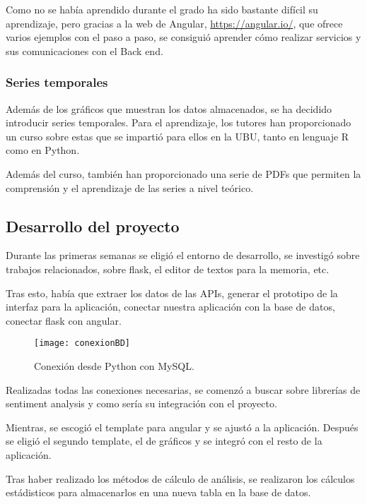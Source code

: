 Como no se había aprendido durante el grado ha sido bastante difícil su aprendizaje, pero gracias a la web de Angular, \url{https://angular.io/}, que ofrece varios ejemplos con el paso a paso, se consiguió aprender cómo realizar servicios y sus comunicaciones con el Back end.

\subsubsection{Series temporales} \cite{time_series_book}
Además de los gráficos que muestran los datos almacenados, se ha decidido introducir series temporales.
Para el aprendizaje, los tutores han proporcionado un curso sobre estas que se impartió para ellos en la UBU, tanto en lenguaje R como en Python.

Además del curso, también han proporcionado una serie de PDFs que permiten la comprensión y el aprendizaje de las series a nivel teórico.

\subsection{Desarrollo del proyecto}
Durante las primeras semanas se eligió el entorno de desarrollo, se investigó sobre trabajos relacionados, sobre flask, el editor de textos para la memoria, etc. 

Tras esto, había que extraer los datos de las APIs, generar el prototipo de la interfaz para la aplicación, conectar nuestra aplicación con la base de datos, conectar flask con angular.
\begin{figure}[h]
    \centering
    \texttt{[image: conexionBD]}
    \caption{Conexión desde Python con MySQL.}
    \label{fig:my_label}
\end{figure}

Realizadas todas las conexiones necesarias, se comenzó a buscar sobre librerías de sentiment analysis y como sería su integración con el proyecto.

Mientras, se escogió el template para angular y se ajustó a la aplicación. Después se eligió el segundo template, el de gráficos y se integró con el resto de la aplicación.


Tras haber realizado los métodos de cálculo de análisis, se realizaron los cálculos estádisticos para almacenarlos en una nueva tabla en la base de datos.

